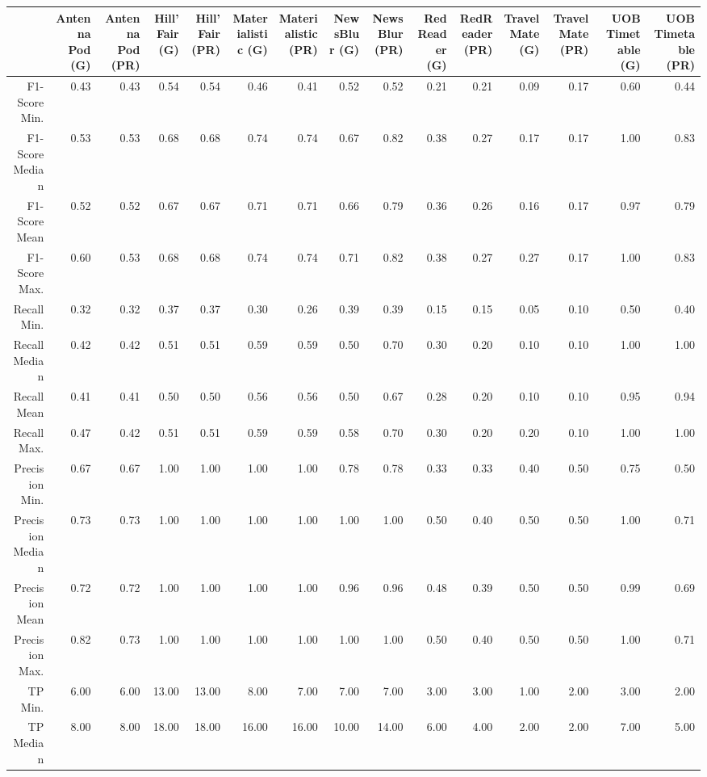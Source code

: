 \begin{table}[ht]
\centering
\begin{tabular}{rrrrrrrrrrrrrrr}
  \hline
 & Antenna Pod (G) & Antenna Pod (PR) & Hill'Fair (G) & Hill'Fair (PR) & Materialistic (G) & Materialistic (PR) & NewsBlur (G) & NewsBlur (PR) & RedReader (G) & RedReader (PR) & Travel Mate (G) & Travel Mate (PR) & UOB Timetable (G) & UOB Timetable (PR) \\ 
  \hline
F1-Score Min. & 0.43 & 0.43 & 0.54 & 0.54 & 0.46 & 0.41 & 0.52 & 0.52 & 0.21 & 0.21 & 0.09 & 0.17 & 0.60 & 0.44 \\ 
  F1-Score Median & 0.53 & 0.53 & 0.68 & 0.68 & 0.74 & 0.74 & 0.67 & 0.82 & 0.38 & 0.27 & 0.17 & 0.17 & 1.00 & 0.83 \\ 
  F1-Score Mean & 0.52 & 0.52 & 0.67 & 0.67 & 0.71 & 0.71 & 0.66 & 0.79 & 0.36 & 0.26 & 0.16 & 0.17 & 0.97 & 0.79 \\ 
  F1-Score Max. & 0.60 & 0.53 & 0.68 & 0.68 & 0.74 & 0.74 & 0.71 & 0.82 & 0.38 & 0.27 & 0.27 & 0.17 & 1.00 & 0.83 \\ 
  Recall Min. & 0.32 & 0.32 & 0.37 & 0.37 & 0.30 & 0.26 & 0.39 & 0.39 & 0.15 & 0.15 & 0.05 & 0.10 & 0.50 & 0.40 \\ 
  Recall Median & 0.42 & 0.42 & 0.51 & 0.51 & 0.59 & 0.59 & 0.50 & 0.70 & 0.30 & 0.20 & 0.10 & 0.10 & 1.00 & 1.00 \\ 
  Recall Mean & 0.41 & 0.41 & 0.50 & 0.50 & 0.56 & 0.56 & 0.50 & 0.67 & 0.28 & 0.20 & 0.10 & 0.10 & 0.95 & 0.94 \\ 
  Recall Max. & 0.47 & 0.42 & 0.51 & 0.51 & 0.59 & 0.59 & 0.58 & 0.70 & 0.30 & 0.20 & 0.20 & 0.10 & 1.00 & 1.00 \\ 
  Precision Min. & 0.67 & 0.67 & 1.00 & 1.00 & 1.00 & 1.00 & 0.78 & 0.78 & 0.33 & 0.33 & 0.40 & 0.50 & 0.75 & 0.50 \\ 
  Precision Median & 0.73 & 0.73 & 1.00 & 1.00 & 1.00 & 1.00 & 1.00 & 1.00 & 0.50 & 0.40 & 0.50 & 0.50 & 1.00 & 0.71 \\ 
  Precision Mean & 0.72 & 0.72 & 1.00 & 1.00 & 1.00 & 1.00 & 0.96 & 0.96 & 0.48 & 0.39 & 0.50 & 0.50 & 0.99 & 0.69 \\ 
  Precision Max. & 0.82 & 0.73 & 1.00 & 1.00 & 1.00 & 1.00 & 1.00 & 1.00 & 0.50 & 0.40 & 0.50 & 0.50 & 1.00 & 0.71 \\ 
  TP Min. & 6.00 & 6.00 & 13.00 & 13.00 & 8.00 & 7.00 & 7.00 & 7.00 & 3.00 & 3.00 & 1.00 & 2.00 & 3.00 & 2.00 \\ 
  TP Median & 8.00 & 8.00 & 18.00 & 18.00 & 16.00 & 16.00 & 10.00 & 14.00 & 6.00 & 4.00 & 2.00 & 2.00 & 7.00 & 5.00 \\ 

\end{tabular}
\end{table}
